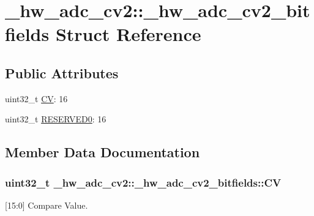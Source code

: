 \hypertarget{struct__hw__adc__cv2_1_1__hw__adc__cv2__bitfields}{}\section{\+\_\+hw\+\_\+adc\+\_\+cv2\+:\+:\+\_\+hw\+\_\+adc\+\_\+cv2\+\_\+bitfields Struct Reference}
\label{struct__hw__adc__cv2_1_1__hw__adc__cv2__bitfields}
\subsection*{Public Attributes}
\begin{DoxyCompactItemize}
\item 
uint32\+\_\+t \hyperlink{struct__hw__adc__cv2_1_1__hw__adc__cv2__bitfields_afc31543312cd3e32183666bb03077738}{CV}\+: 16
\item 
uint32\+\_\+t \hyperlink{struct__hw__adc__cv2_1_1__hw__adc__cv2__bitfields_a3a109abaf02b9cd536b5e57be772825b}{R\+E\+S\+E\+R\+V\+E\+D0}\+: 16
\end{DoxyCompactItemize}


\subsection{Member Data Documentation}
\subsubsection[{\texorpdfstring{CV}{CV}}]{\setlength{\rightskip}{0pt plus 5cm}uint32\+\_\+t \+\_\+hw\+\_\+adc\+\_\+cv2\+::\+\_\+hw\+\_\+adc\+\_\+cv2\+\_\+bitfields\+::\+CV}\hypertarget{struct__hw__adc__cv2_1_1__hw__adc__cv2__bitfields_afc31543312cd3e32183666bb03077738}{}\label{struct__hw__adc__cv2_1_1__hw__adc__cv2__bitfields_afc31543312cd3e32183666bb03077738}
\mbox{[}15\+:0\mbox{]} Compare Value. 

